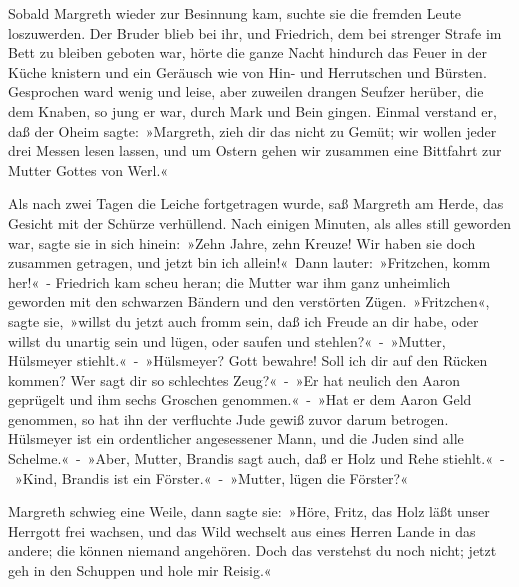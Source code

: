 Sobald Margreth wieder zur Besinnung kam, suchte sie die fremden Leute loszuwerden. Der Bruder blieb bei ihr, und Friedrich, dem bei strenger Strafe im Bett zu bleiben geboten war, hörte die ganze Nacht hindurch das Feuer in der Küche knistern und ein Geräusch wie von Hin- und Herrutschen und Bürsten. Gesprochen ward wenig und leise, aber zuweilen drangen Seufzer herüber, die dem Knaben, so jung er war, durch Mark und Bein gingen. Einmal verstand er, daß der Oheim sagte: »Margreth, zieh dir das nicht zu Gemüt; wir wollen jeder drei Messen lesen lassen, und um Ostern gehen wir zusammen eine Bittfahrt zur Mutter Gottes von Werl.«

Als nach zwei Tagen die Leiche fortgetragen wurde, saß Margreth am Herde, das Gesicht mit der Schürze verhüllend. Nach einigen Minuten, als alles still geworden war, sagte sie in sich hinein: »Zehn Jahre, zehn Kreuze! Wir haben sie doch zusammen getragen, und jetzt bin ich allein!« Dann lauter: »Fritzchen, komm her!« - Friedrich kam scheu heran; die Mutter war ihm ganz unheimlich geworden mit den schwarzen Bändern und den verstörten Zügen. »Fritzchen«, sagte sie, »willst du jetzt auch fromm sein, daß ich Freude an dir habe, oder willst du unartig sein und lügen, oder saufen und stehlen?« - »Mutter, Hülsmeyer stiehlt.« - »Hülsmeyer? Gott bewahre! Soll ich dir auf den Rücken kommen? Wer sagt dir so schlechtes Zeug?« - »Er hat neulich den Aaron geprügelt und ihm sechs Groschen genommen.« - »Hat er dem Aaron Geld genommen, so hat ihn der verfluchte Jude gewiß zuvor darum betrogen. Hülsmeyer ist ein ordentlicher angesessener Mann, und die Juden sind alle Schelme.« - »Aber, Mutter, Brandis sagt auch, daß er Holz und Rehe stiehlt.« - »Kind, Brandis ist ein Förster.« - »Mutter, lügen die Förster?«

Margreth schwieg eine Weile, dann sagte sie: »Höre, Fritz, das Holz läßt unser Herrgott frei wachsen, und das Wild wechselt aus eines Herren Lande in das andere; die können niemand angehören. Doch das verstehst du noch nicht; jetzt geh in den Schuppen und hole mir Reisig.«

